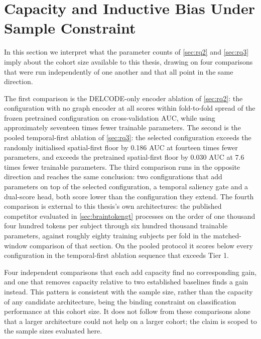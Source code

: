 \section{Capacity and Inductive Bias Under Sample Constraint}\label{sec:capacity}

In this section we interpret what the parameter counts of \autoref{sec:rq2} and
\autoref{sec:rq3} imply about the cohort size available to this thesis, drawing on four
comparisons that were run independently of one another and that all point in the same
direction.

The first comparison is the \ac{DELCODE}-only encoder ablation of \autoref{sec:rq2}: the
configuration with no graph encoder at all scores within fold-to-fold spread of the frozen
pretrained configuration on cross-validation \ac{AUC}, while using approximately
seventeen times fewer trainable parameters. The second is the pooled temporal-first
ablation of \autoref{sec:rq3}: the selected configuration exceeds the randomly initialised
spatial-first floor by 0.186 \ac{AUC} at fourteen times fewer parameters, and exceeds the
pretrained spatial-first floor by 0.030 \ac{AUC} at 7.6 times fewer trainable parameters.
The third comparison runs in the opposite direction and reaches the same conclusion: two
configurations that add parameters on top of the selected configuration, a temporal
saliency gate and a dual-score head, both score lower than the configuration they extend.
The fourth comparison is external to this thesis's own architectures: the published
competitor evaluated in \autoref{sec:braintokengt} processes on the order of one thousand
four hundred tokens per subject through six hundred thousand trainable parameters, against
roughly eighty training subjects per fold in the matched-window comparison of that section.
On the pooled protocol it scores below every configuration in the temporal-first ablation
sequence that exceeds Tier 1.

Four independent comparisons that each add capacity find no corresponding gain, and one
that removes capacity relative to two established baselines finds a gain instead. This
pattern is consistent with the sample size, rather than the capacity of any candidate
architecture, being the binding constraint on classification performance at this cohort
size. It does not follow from these comparisons alone that a larger architecture could not
help on a larger cohort; the claim is scoped to the sample sizes evaluated here.

